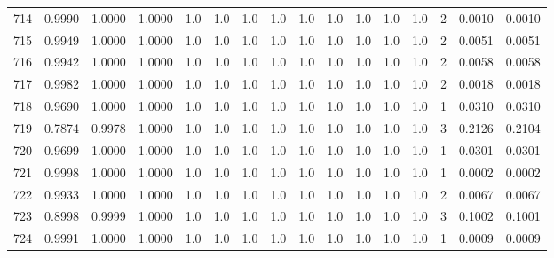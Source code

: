 \begin{tabular}{lrrrrrrrrrrrrrrr}
714 &      0.9990 &  1.0000 &  1.0000 &     1.0 &     1.0 &     1.0 &     1.0 &     1.0 &     1.0 &     1.0 &      1.0 &        1.0 &      2 &                    0.0010 &                     0.0010 \\
715 &      0.9949 &  1.0000 &  1.0000 &     1.0 &     1.0 &     1.0 &     1.0 &     1.0 &     1.0 &     1.0 &      1.0 &        1.0 &      2 &                    0.0051 &                     0.0051 \\
716 &      0.9942 &  1.0000 &  1.0000 &     1.0 &     1.0 &     1.0 &     1.0 &     1.0 &     1.0 &     1.0 &      1.0 &        1.0 &      2 &                    0.0058 &                     0.0058 \\
717 &      0.9982 &  1.0000 &  1.0000 &     1.0 &     1.0 &     1.0 &     1.0 &     1.0 &     1.0 &     1.0 &      1.0 &        1.0 &      2 &                    0.0018 &                     0.0018 \\
718 &      0.9690 &  1.0000 &  1.0000 &     1.0 &     1.0 &     1.0 &     1.0 &     1.0 &     1.0 &     1.0 &      1.0 &        1.0 &      1 &                    0.0310 &                     0.0310 \\
719 &      0.7874 &  0.9978 &  1.0000 &     1.0 &     1.0 &     1.0 &     1.0 &     1.0 &     1.0 &     1.0 &      1.0 &        1.0 &      3 &                    0.2126 &                     0.2104 \\
720 &      0.9699 &  1.0000 &  1.0000 &     1.0 &     1.0 &     1.0 &     1.0 &     1.0 &     1.0 &     1.0 &      1.0 &        1.0 &      1 &                    0.0301 &                     0.0301 \\
721 &      0.9998 &  1.0000 &  1.0000 &     1.0 &     1.0 &     1.0 &     1.0 &     1.0 &     1.0 &     1.0 &      1.0 &        1.0 &      1 &                    0.0002 &                     0.0002 \\
722 &      0.9933 &  1.0000 &  1.0000 &     1.0 &     1.0 &     1.0 &     1.0 &     1.0 &     1.0 &     1.0 &      1.0 &        1.0 &      2 &                    0.0067 &                     0.0067 \\
723 &      0.8998 &  0.9999 &  1.0000 &     1.0 &     1.0 &     1.0 &     1.0 &     1.0 &     1.0 &     1.0 &      1.0 &        1.0 &      3 &                    0.1002 &                     0.1001 \\
724 &      0.9991 &  1.0000 &  1.0000 &     1.0 &     1.0 &     1.0 &     1.0 &     1.0 &     1.0 &     1.0 &      1.0 &        1.0 &      1 &                    0.0009 &                     0.0009 \\

\end{tabular}
